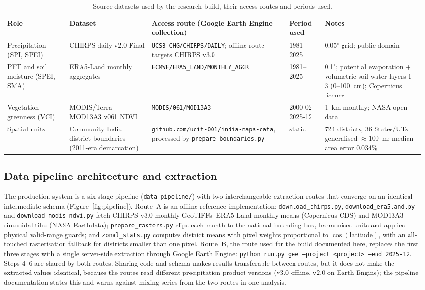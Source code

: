 \documentclass[10pt,a4paper]{article}
\begin{document}
\begin{table}[t]
\caption{Source datasets used by the research build, their access routes and periods used.}
\label{tab:sources}
\small
\begin{tabularx}{\textwidth}{@{}p{}p{}p{}p{}X@{}}
\toprule
Role & Dataset & Access route (Google Earth Engine collection) & Period used & Notes \\
\midrule
Precipitation (SPI, SPEI) & CHIRPS daily v2.0 Final & \texttt{UCSB-CHG/CHIRPS/DAILY}; offline route targets CHIRPS v3.0 & 1981--2025 & 0.05$^\circ$ grid; public domain \\
PET and soil moisture (SPEI, SMA) & ERA5-Land monthly aggregates & \texttt{ECMWF/ERA5\_LAND/MONTHLY\_AGGR} & 1981--2025 & 0.1$^\circ$; potential evaporation + volumetric soil water layers 1--3 (0--100~cm); Copernicus licence \\
Vegetation greenness (VCI) & MODIS/Terra MOD13A3 v061 NDVI & \texttt{MODIS/061/MOD13A3} & 2000-02--2025-12 & 1~km monthly; NASA open data \\
Spatial units & Community India district boundaries (2011-era demarcation) & \texttt{github.com/udit-001/india-maps-data}; processed by \texttt{prepare\_boundaries.py} & static & 724 districts, 36 States/UTs; generalised $\approx$100~m; median area error 0.034\% \\
\bottomrule
\end{tabularx}
\end{table}

\subsection*{Data pipeline architecture and extraction}
The production system is a six-stage pipeline (\texttt{data\_pipeline/}) with two interchangeable extraction routes that converge on an identical intermediate schema (Figure~\ref{fig:pipeline}). Route~A is an offline reference implementation: \texttt{download\_chirps.py}, \texttt{download\_era5land.py} and \texttt{download\_modis\_ndvi.py} fetch CHIRPS v3.0 monthly GeoTIFFs, ERA5-Land monthly means (Copernicus CDS) and MOD13A3 sinusoidal tiles (NASA Earthdata); \texttt{prepare\_rasters.py} clips each month to the national bounding box, harmonises units and applies physical valid-range guards; and \texttt{zonal\_stats.py} computes district means with pixel weights proportional to $\cos(\mathrm{latitude})$, with an all-touched rasterisation fallback for districts smaller than one pixel. Route~B, the route used for the build documented here, replaces the first three stages with a single server-side extraction through Google Earth Engine\citep{Gorelick2017}: \texttt{python run.py gee --project <project> --end 2025-12}. Steps 4--6 are shared by both routes. Sharing code and schema makes results transferable between routes, but it does not make the extracted values identical, because the routes read different precipitation product versions (v3.0 offline, v2.0 on Earth Engine); the pipeline documentation states this and warns against mixing series from the two routes in one analysis.
\end{document}
